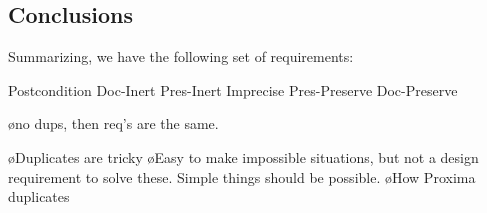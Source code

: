 \subsection{Conclusions}

Summarizing, we have the following set of requirements:

		{Postcondition}
  {Doc-Inert}
		{Pres-Inert}
	{Imprecise}
	{Pres-Preserve}
	{Doc-Preserve}

\toHere

\bl
\o no dups, then req's are the same.
\el

\bl
\o Duplicates are tricky
\o Easy to make impossible situations, but not a design requirement to solve these. Simple things should be possible.
\o How Proxima duplicates
\el









%																
%																
%																


%																
%																
%																


